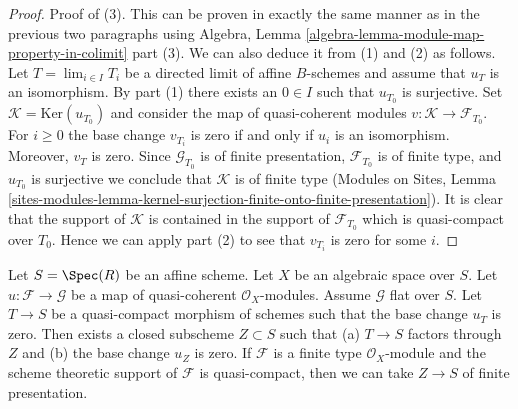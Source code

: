 \begin{proof}
\medskip\noindent
Proof of (3). This can be proven in exactly the same manner as in the
previous two paragraphs using
Algebra, Lemma \ref{algebra-lemma-module-map-property-in-colimit} part (3).
We can also deduce it from (1) and (2) as follows.
Let $T = \lim_{i \in I} T_i$ be a directed limit of affine $B$-schemes
and assume that $u_T$ is an isomorphism. By part (1) there exists
an $0 \in I$ such that $u_{T_0}$ is surjective. Set
$\mathcal{K} = \text{Ker}(u_{T_0})$ and consider the map of quasi-coherent
modules $v : \mathcal{K} \to \mathcal{F}_{T_0}$. For $i \geq 0$ the base
change $v_{T_i}$ is zero if and only if $u_i$ is an isomorphism. Moreover,
$v_T$ is zero. Since $\mathcal{G}_{T_0}$
is of finite presentation, $\mathcal{F}_{T_0}$ is of finite type, and
$u_{T_0}$ is surjective we conclude that $\mathcal{K}$ is of finite type
(Modules on Sites, Lemma
\ref{sites-modules-lemma-kernel-surjection-finite-onto-finite-presentation}).
It is clear that the support of $\mathcal{K}$ is contained in the
support of $\mathcal{F}_{T_0}$ which is quasi-compact over $T_0$.
Hence we can apply part (2) to see that $v_{T_i}$ is zero for some $i$. 
\end{proof}

\begin{lemma}
\label{lemma-F-zero-somewhat-closed}
Let $S = \Spec(R)$ be an affine scheme. Let $X$ be an algebraic space over
$S$. Let $u : \mathcal{F} \to \mathcal{G}$ be a map of quasi-coherent
$\mathcal{O}_X$-modules. Assume $\mathcal{G}$ flat over $S$. Let $T \to S$
be a quasi-compact morphism of schemes such that the base change $u_T$ is
zero. Then exists a closed subscheme $Z \subset S$ such that
(a) $T \to S$ factors through $Z$ and (b) the base change $u_Z$ is zero.
If $\mathcal{F}$ is a finite type $\mathcal{O}_X$-module and
the scheme theoretic support of $\mathcal{F}$ is quasi-compact,
then we can take $Z \to S$ of finite presentation.
\end{lemma}

